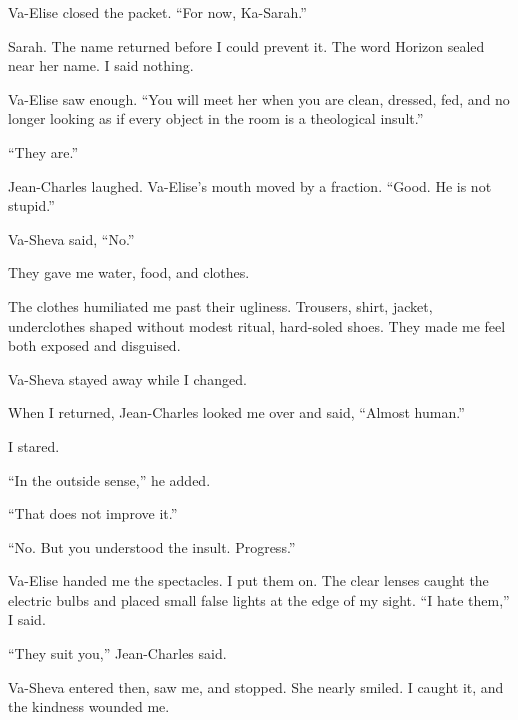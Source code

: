 Va-Elise closed the packet. ``For now, Ka-Sarah.''\par

Sarah. The name returned before I could prevent it. The word Horizon sealed near her name. I said nothing.\par

Va-Elise saw enough. ``You will meet her when you are clean, dressed, fed, and no longer looking as if every object in the room is a theological insult.''\par

``They are.''\par

Jean-Charles laughed. Va-Elise's mouth moved by a fraction. ``Good. He is not stupid.''\par

Va-Sheva said, ``No.''\par

\ornament

They gave me water, food, and clothes.\par

The clothes humiliated me past their ugliness. Trousers, shirt, jacket, underclothes shaped without modest ritual, hard-soled shoes. They made me feel both exposed and disguised.\par

Va-Sheva stayed away while I changed.\par

When I returned, Jean-Charles looked me over and said, ``Almost human.''\par

I stared.\par

``In the outside sense,'' he added.\par

``That does not improve it.''\par

``No. But you understood the insult. Progress.''\par

Va-Elise handed me the spectacles. I put them on. The clear lenses caught the electric bulbs and placed small false lights at the edge of my sight. ``I hate them,'' I said.\par

``They suit you,'' Jean-Charles said.\par

Va-Sheva entered then, saw me, and stopped. She nearly smiled. I caught it, and the kindness wounded me.\par


